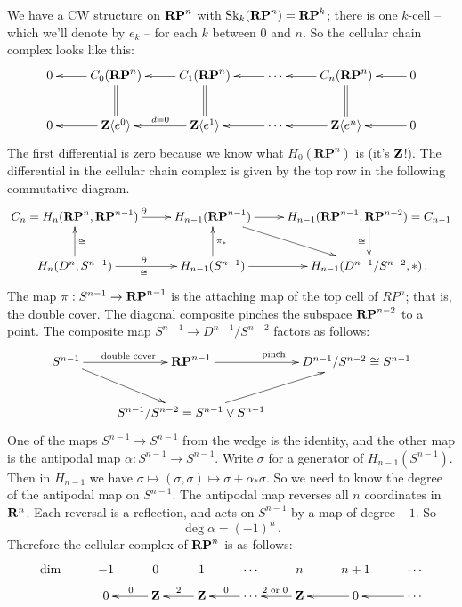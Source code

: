 We have a CW structure on $\mathbf{RP}^n$ with $\mathrm{Sk}_k(\mathbf{RP}^n)=\mathbf{RP}^k$;
there is one $k$-cell -- which we'll denote by $e_k$ -- for each $k$ between $0$ and $n$. So the cellular chain complex looks like this:
\begin{equation*}
\xymatrix{0  & C_0(\mathbf{RP}^n)\ar@{=}[d]\ar[l] & C_1(\mathbf{RP}^n)\ar@{=}[d]\ar[l] & \cdots\ar[l] & C_n(\mathbf{RP}^n)\ar@{=}[d]\ar[l] & 0 \ar[l]\\
0 & \Z\langle e^0\rangle \ar[l] & \Z\langle e^1\rangle\ar[l]_{d=0} & \cdots\ar[l] & \Z\langle e^n\rangle\ar[l] & 0 \ar[l] }
\end{equation*}
The first differential is zero because we know what $ H_0(\mathbf{RP}^n)$ is (it's $\mathbf Z$!). The differential in the cellular chain complex is given by the top
row in the following commutative diagram.
\begin{equation*}
\xymatrix{C_n= H_n(\mathbf{RP}^n,\mathbf{RP}^{n-1})\ar[r]^\partial & 
H_{n-1}(\mathbf{RP}^{n-1}) \ar[r] \ar[dr] & 
H_{n-1}(\mathbf{RP}^{n-1},\mathbf{RP}^{n-2})=C_{n-1} \ar[d]_{\cong} \\
H_n(D^n,S^{n-1}) \ar[u]_\cong \ar[r]^\partial_\cong & 
H_{n-1}(S^{n-1}) \ar[u]_{\pi_*} \ar[r] & H_{n-1}(D^{n-1}/S^{n-2},\ast)\,.
}
\end{equation*}
The map $\pi:S^{n-1}\to\mathbf{RP}^{n-1}$ is the attaching map of the top cell of $RP^n$; that is, the double cover. The diagonal composite pinches the subspace 
$\mathbf{RP}^{n-2}$ to a point. The composite map $S^{n-1}\to D^{n-1}/S^{n-2}$ 
factors as follows: 
\begin{equation*}
\xymatrix{S^{n-1}\ar[r]^{\text{double cover}}\ar[dr] & \mathbf{RP}^{n-1}\ar[r]^{\text{pinch}} & D^{n-1}/S^{n-2}\cong S^{n-1}\\
 & S^{n-1}/S^{n-2}=S^{n-1}\vee S^{n-1}\ar[ur]}
\end{equation*}
One of the maps $S^{n-1}\to S^{n-1}$ from the wedge is the identity, and the other map is the antipodal map $\alpha:S^{n-1}\to S^{n-1}$. Write $\sigma$ for a generator of $ H_{n-1}(S^{n-1})$. Then in $H_{n-1}$ we have $\sigma\mapsto (\sigma,\sigma)\mapsto \sigma+\alpha_\ast\sigma$. So we need to know the degree of the antipodal map on $S^{n-1}$. The antipodal map reverses all $n$ coordinates in $\mathbf R^n$. Each reversal is a reflection, and acts on $S^{n-1}$ by a map of degree $-1$. So 
\[
\deg\alpha=(-1)^n\,.
\]
Therefore the cellular complex of $\mathbf{RP}^n$ is as follows: 
\begin{equation*}
\xymatrix@R=8pt{
\hbox{dim} & -1 & 0 & 1 & \cdots & n & n+1 & \cdots \\
& 0 & \Z\ar[l]_0 & \Z\ar[l]_2 & \cdots\ar[l]_0 & \Z\ar[l]_{2\text{ or }0} & 0\ar[l] & \cdots\ar[l]}
\end{equation*}
